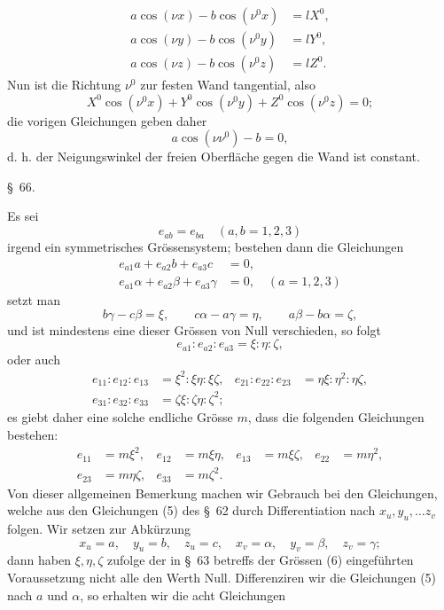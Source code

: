 \documentclass[11pt,a4paper,leqno]{article}
\begin{document}
\[
\begin{aligned}
a\cos(\nu x)-b\cos(\nu^0x)&=lX^0,\\
a\cos(\nu y)-b\cos(\nu^0y)&=lY^0,\\
a\cos(\nu z)-b\cos(\nu^0z)&=lZ^0.
\end{aligned}
\]
Nun ist die Richtung $\nu^0$ zur festen Wand tangential, also
\[
X^0\cos(\nu^0x)+Y^0\cos(\nu^0y)+Z^0\cos(\nu^0z)=0;
\]
die vorigen Gleichungen geben daher
\[
a\cos(\nu\nu^0)-b=0,
\]
d. h. der Neigungswinkel der freien Oberfläche gegen die Wand ist constant.


\begin{center}
{\large \S~66.}
\end{center}

Es sei
\[
e_{ab}=e_{ba}\quad(a,b=1,2,3)
\]
irgend ein symmetrisches Grössensystem; bestehen dann die
Gleichungen
\begin{equation}\tag{18}
\begin{aligned}
e_{a1}a+e_{a2}b+e_{a3}c&=0,\\
e_{a1}\alpha+e_{a2}\beta+e_{a3}\gamma&=0,\quad(a=1,2,3)
\end{aligned}
\end{equation}
setzt man
\[
b\gamma-c\beta=\xi,\qquad c\alpha-a\gamma=\eta,
\qquad a\beta-b\alpha=\zeta,
\]
und ist mindestens eine dieser Grössen von Null verschieden,
so folgt
\[
e_{a1}:e_{a2}:e_{a3}=\xi:\eta:\zeta,
\]
oder auch
\[
\begin{aligned}
e_{11}:e_{12}:e_{13}&=\xi^2:\xi\eta:\xi\zeta,
&e_{21}:e_{22}:e_{23}&=\eta\xi:\eta^2:\eta\zeta,\\
e_{31}:e_{32}:e_{33}&=\zeta\xi:\zeta\eta:\zeta^2;
\end{aligned}
\]
es giebt daher eine solche endliche Grösse $m$, dass die folgenden
Gleichungen bestehen:
\[
\begin{aligned}
e_{11}&=m\xi^2,&e_{12}&=m\xi\eta,&e_{13}&=m\xi\zeta,&e_{22}&=m\eta^2,\\
e_{23}&=m\eta\zeta,&e_{33}&=m\zeta^2.
\end{aligned}
\]
Von dieser allgemeinen Bemerkung machen wir Gebrauch
bei den Gleichungen, welche aus den Gleichungen (5) des \S~62
durch Differentiation nach $x_u,y_u,\ldots z_v$ folgen. Wir setzen zur
Abkürzung
\[
x_u=a,\quad y_u=b,\quad z_u=c,\quad x_v=\alpha,\quad y_v=\beta,\quad z_v=\gamma;
\]
dann haben $\xi,\eta,\zeta$ zufolge der in \S~63 betreffs der Grössen (6)
eingeführten Voraussetzung nicht alle den Werth Null. Differenziren
wir die Gleichungen (5) nach $a$ und $\alpha$, so erhalten wir die
acht Gleichungen
\end{document}
